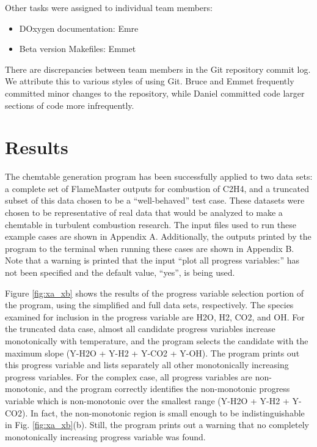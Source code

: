 \documentclass[11pt]{article}
\begin{document}
Other tasks were assigned to individual team members:
\begin{itemize}
\item DOxygen documentation: Emre
\item Beta version Makefiles: Emmet
\end{itemize}

There are discrepancies between team members in the Git repository commit log. We attribute this to various styles of using Git. Bruce and Emmet frequently committed minor changes to the repository, while Daniel committed code larger sections of code more infrequently. 

\section{Results}

The chemtable generation program has been successfully applied to two data sets: a complete set of FlameMaster outputs for combustion of C2H4, and a truncated subset of this data chosen to be a “well-behaved” test case. These datasets were chosen to be representative of real data that would be analyzed to make a chemtable in turbulent combustion research. The input files used to run these example cases are shown in Appendix A. Additionally, the outputs printed by the program to the terminal when running these cases are shown in Appendix B. Note that a warning is printed that the input “plot all progress variables:” has not been specified and the default value, “yes”, is being used. 

Figure \ref{fig:xa_xb} shows the results of the progress variable selection portion of the program, using the simplified and full data sets, respectively. The species examined for inclusion in the progress variable are H2O, H2, CO2, and OH. For the truncated data case, almost all candidate progress variables increase monotonically with temperature, and the program selects the candidate with the maximum slope (Y-H2O + Y-H2 + Y-CO2 + Y-OH). The program prints out this progress variable and lists separately all other monotonically increasing progress variables. For the complex case, all progress variables are non-monotonic, and the program correctly identifies the non-monotonic progress variable which is non-monotonic over the smallest range (Y-H2O + Y-H2 + Y-CO2). In fact, the non-monotonic region is small enough to be indistinguishable in Fig. \ref{fig:xa_xb}(b). Still, the program prints out a warning that no completely monotonically increasing progress variable was found.
\end{document}
